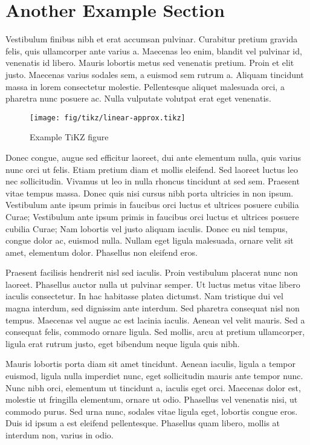 \section{Another Example Section}
\label{sec:tikz}

Vestibulum finibus nibh et erat accumsan pulvinar.
Curabitur pretium gravida felis, quis ullamcorper ante varius a.
Maecenas leo enim, blandit vel pulvinar id, venenatis id libero.
Mauris lobortis metus sed venenatis pretium.
Proin et elit justo.
Maecenas varius sodales sem, a euismod sem rutrum a.
Aliquam tincidunt massa in lorem consectetur molestie.
Pellentesque aliquet malesuada orci, a pharetra nunc posuere ac.
Nulla vulputate volutpat erat eget venenatis.

\begin{figure}[htbp]
  \centering
  \texttt{[image: fig/tikz/linear-approx.tikz]}
  \caption{Example TiKZ figure}
  \label{fig:tikz}
\end{figure}

Donec congue, augue sed efficitur laoreet, dui ante elementum nulla, quis varius nunc orci ut felis.
Etiam pretium diam et mollis eleifend.
Sed laoreet luctus leo nec sollicitudin.
Vivamus ut leo in nulla rhoncus tincidunt at sed sem.
Praesent vitae tempus massa.
Donec quis nisi cursus nibh porta ultricies in non ipsum.
Vestibulum ante ipsum primis in faucibus orci luctus et ultrices posuere cubilia Curae; Vestibulum ante ipsum primis in faucibus orci luctus et ultrices posuere cubilia Curae; Nam lobortis vel justo aliquam iaculis.
Donec eu nisl tempus, congue dolor ac, euismod nulla.
Nullam eget ligula malesuada, ornare velit sit amet, elementum dolor.
Phasellus non eleifend eros.


Praesent facilisis hendrerit nisl sed iaculis.
Proin vestibulum placerat nunc non laoreet.
Phasellus auctor nulla ut pulvinar semper.
Ut luctus metus vitae libero iaculis consectetur.
In hac habitasse platea dictumst.
Nam tristique dui vel magna interdum, sed dignissim ante interdum.
Sed pharetra consequat nisl non tempus.
Maecenas vel augue ac est lacinia iaculis.
Aenean vel velit mauris.
Sed a consequat felis, commodo ornare ligula.
Sed mollis, arcu at pretium ullamcorper, ligula erat rutrum justo, eget bibendum neque ligula quis nibh.


Mauris lobortis porta diam sit amet tincidunt.
Aenean iaculis, ligula a tempor euismod, ligula nulla imperdiet nunc, eget sollicitudin mauris ante tempor nunc.
Nunc nibh orci, elementum ut tincidunt a, iaculis eget orci.
Maecenas dolor est, molestie ut fringilla elementum, ornare ut odio.
Phasellus vel venenatis nisi, ut commodo purus.
Sed urna nunc, sodales vitae ligula eget, lobortis congue eros.
Duis id ipsum a est eleifend pellentesque.
Phasellus quam libero, mollis at interdum non, varius in odio.
